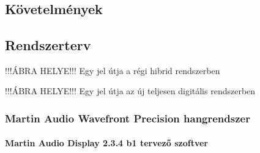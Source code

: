 \chapter{\SystemDesign}

\section{Követelmények}






 

\section{Rendszerterv}








!!!ÁBRA HELYE!!!
Egy jel útja a régi hibrid rendszerben





!!!ÁBRA HELYE!!!
Egy jel útja az új teljesen digitális rendszerben

\subsection{Martin Audio Wavefront Precision hangrendszer}

\subsubsection{Martin Audio Display 2.3.4 b1 tervező szoftver}

